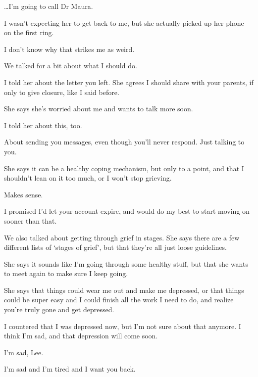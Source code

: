 {
\ldots{}I'm going to call Dr Maura.

 I wasn't expecting her to get back to me, but she actually picked up her phone on the first ring.

 I don't know why that strikes me as weird.

 We talked for a bit about what I should do.

 I told her about the letter you left. She agrees I should share with your parents, if only to give closure, like I said before.

 She says she's worried about me and wants to talk more soon.

 I told her about this, too.

 About sending you messages, even though you'll never respond. Just talking to you.

 She says it can be a healthy coping mechanism, but only to a point, and that I shouldn't lean on it too much, or I won't stop grieving.

 Makes sense.

 I promised I'd let your account expire, and would do my best to start moving on sooner than that.

 We also talked about getting through grief in stages. She says there are a few different lists of `stages of grief', but that they're all just loose guidelines.

 She says it sounds like I'm going through some healthy stuff, but that she wants to meet again to make sure I keep going.

 She says that things could wear me out and make me depressed, or that things could be super easy and I could finish all the work I need to do, and realize you're truly gone and get depressed.

 I countered that I was depressed now, but I'm not sure about that anymore. I think I'm sad, and that depression will come soon.

 I'm sad, Lee.

 I'm sad and I'm tired and I want you back.

}
